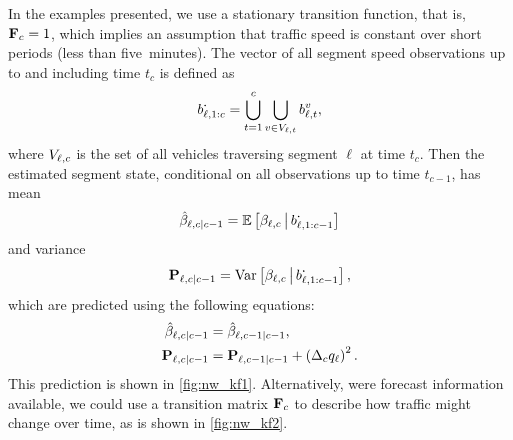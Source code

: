 In the examples presented, we use a stationary transition function, that is, $\mathbf{F}_c = 1$, which implies an assumption that traffic speed is constant over short periods (less than five~minutes). The vector of all segment speed observations up to and including time $t_{c}$ is defined as
\begin{equation}\label{eq:all_seg_obs}
b_{\ell,1:c}^{\boldsymbol{\cdot}} = \bigcup_{t=1}^{c} \bigcup_{v\in V_{\ell,t}} b_{\ell,t}^v,
\end{equation}
where $V_{\ell,c}$ is the set of all vehicles traversing segment $\ell$ at time $t_c$. Then the estimated segment state, conditional on all observations up to time $t_{c-1}$, has mean
\begin{equation}\label{eq:ch4:nw_state_mean_est}
\hat{\beta}_{\ell,c|c-1} =
    \mathbb{E}\left[\beta_{\ell,c} \,\big|\,{} b_{\ell,1:c-1}^{\boldsymbol{\cdot}}\right]
\end{equation}
and variance
\begin{equation}\label{eq:ch4:nw_state_var_est}
\mathbf{P}_{\ell,c|c-1} =
    \mathrm{Var}\left[\beta_{\ell,c} \,\big|\,{} b_{\ell,1:c-1}^{\boldsymbol{\cdot}}\right],
\end{equation}
which are predicted using the following equations:
\begin{equation}
\label{eq:nw_kf_predict}
\begin{split}
\hat{\beta}_{\ell,c|c-1} &=
    \hat{\beta}_{
\ell,c-1|c-1}, \\
\mathbf{P}_{\ell,c|c-1} &= \mathbf{P}_{\ell,c-1|c-1} + \left(\Delta_cq_\ell\right)^2.
\end{split}
\end{equation}
This prediction is shown in \cref{fig:nw_kf1}. Alternatively, were forecast information available, we could use a transition matrix $\mathbf{F}_c$ to describe how traffic might change over time, as is shown in \cref{fig:nw_kf2}.


